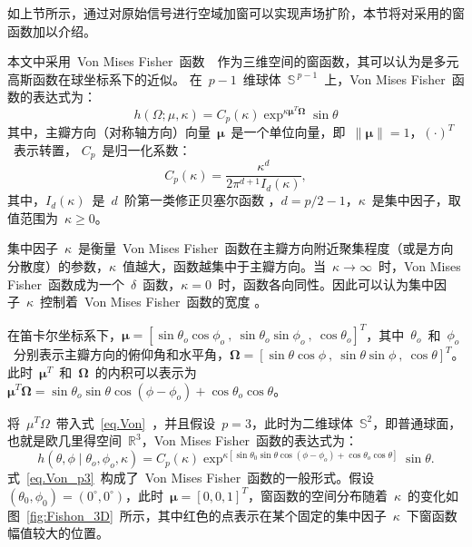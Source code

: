 如上节所示，通过对原始信号进行空域加窗可以实现声场扩阶，本节将对采用的窗函数加以介绍。

本文中采用~Von Mises Fisher~函数~~作为三维空间的窗函数，其可以认为是多元高斯函数在球坐标系下的近似。
在~$p-1$~维球体~$\mathbb{S}^{~p-1}$~上，Von Mises Fisher~函数的表达式为：
\begin{equation}\label{eq.Von}
h(\Omega ; \mu, \kappa)=C_{p}(\kappa) \exp ^{\kappa \bm{\mu}^{T} \bm{\Omega}} \sin \theta
\end{equation}
其中，主瓣方向（对称轴方向）向量~$\bm{\mu}$~是一个单位向量，即~$\|\bm{\mu}\|=1$，$(\cdot)^{T}$~表示转置，
$C_{p}$~是归一化系数：
\begin{equation*}
C_{p}(\kappa)=\frac{\kappa^{d}}{2 \pi^{d+1} I_{d}(\kappa)},
\end{equation*}
其中，$I_{d}(\kappa)$~是~$d$~阶第一类修正贝塞尔函数 ，$d=p/2-1$，$\kappa$~是集中因子，取值范围为~$\kappa \geq 0$。

集中因子~$\kappa$~是衡量~Von Mises Fisher~函数在主瓣方向附近聚集程度（或是方向分散度）的参数，$\kappa$~值越大，函数越集中于主瓣方向。当~$\kappa \rightarrow \infty$~时，Von Mises Fisher~函数成为一个~$\delta$~函数，$\kappa=0$~时，函数各向同性。因此可以认为集中因子~$\kappa$~控制着~Von Mises Fisher~函数的宽度 。

在笛卡尔坐标系下，$\bm{\mu}=\left[\sin \theta_{o} \cos \phi_{o} ~,~ \sin \theta_{o} \sin \phi_{o} ~,~  \cos \theta_{o}\right]^{T}$，其中~$\theta_{o}$~和~$\phi_{o}$~分别表示主瓣方向的俯仰角和水平角，$\bm{\Omega}=\left[\sin \theta \cos \phi ~,~ \sin \theta \sin \phi ~,~ \cos \theta\right]^{T}$。此时~$\bm{\mu}^{T}$~和~$\bm{\Omega}$~的内积可以表示为~$\bm{\mu}^{T}\bm{\Omega}=\sin \theta_{o} \sin\theta \cos \left(\phi-\phi_{o}\right)+\cos \theta_{o} \cos \theta$。

将~$\mu^{T} \Omega$~带入式~\eqref{eq.Von}~，并且假设~$p=3$，此时为二维球体~$\mathbb{S}^{2}$，即普通球面，也就是欧几里得空间~$\mathbb{R}^{3}$，Von Mises Fisher~函数的表达式为：
\begin{equation}\label{eq.Von_p3}
h \left(\theta, \phi \mid \theta_{o}, \phi_{o}, \kappa\right)
=C_{p}(\kappa) \exp ^{\kappa\left[\sin \theta_{0} \sin \theta \cos \left(\phi-\phi_{o}\right)+\cos \theta_{o} \cos \theta\right]} \sin \theta.
\end{equation}
式~\eqref{eq.Von_p3}~构成了~Von Mises Fisher~函数的一般形式。假设~$(\theta_{0},\phi_{0})=(0^{\circ},0^{\circ})$，此时~$\bm{\mu}=\left[ 0,0,1\right]^{T}$，窗函数的空间分布随着~$\kappa$~的变化如图~\ref{fig:Fishon_3D}~所示，其中红色的点表示在某个固定的集中因子~$\kappa$~下窗函数幅值较大的位置。

